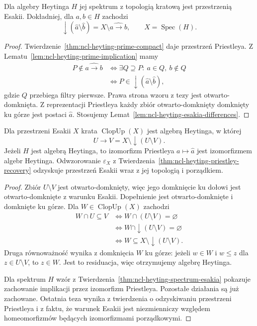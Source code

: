 \begin{twierdzenie}
\label{thm:ncl-heyting-spectrum-esakia}
Dla algebry Heytinga $H$ jej spektrum
z topologią kratową jest przestrzenią Esakii.
Dokładniej, dla $a,b\in H$ zachodzi
\[
 \downarrow(\widehat a\setminus\widehat b)
 =X\setminus\widehat{a\to b},
 \qquad X=\operatorname{Spec}(H).
\]
\end{twierdzenie}
\begin{proof}
Twierdzenie~\ref{thm:ncl-heyting-prime-compact}
daje przestrzeń Priestleya.
Z Lematu~\ref{lem:ncl-heyting-prime-implication}
mamy
\[
\begin{aligned}
 P\notin\widehat{a\to b}
 &\iff \exists Q\supseteq P:\ a\in Q,\ b\notin Q\\
 &\iff P\in\downarrow(\widehat a\setminus\widehat b),
\end{aligned}
\]
gdzie $Q$ przebiega filtry pierwsze.
Prawa strona wzoru z tezy jest otwarto-domknięta.
Z reprezentacji Priestleya każdy zbiór
otwarto-domknięty domknięty ku górze jest
postaci $\widehat a$. Stosujemy
Lemat~\ref{lem:ncl-heyting-esakia-differences}.
\end{proof}

\begin{twierdzenie}
\label{thm:ncl-heyting-esakia-algebra}
Dla przestrzeni Esakii $X$ krata
$\operatorname{ClopUp}(X)$ jest algebrą Heytinga,
w której
\[
 U\to V=X\setminus\downarrow(U\setminus V).
\]
Jeżeli $H$ jest algebrą Heytinga, to izomorfizm
Priestleya $a\mapsto\widehat a$ jest izomorfizmem
algebr Heytinga.
Odwzorowanie $\varepsilon_X$ z
Twierdzenia~\ref{thm:ncl-heyting-priestley-recovery}
odzyskuje przestrzeń Esakii wraz z jej topologią
i porządkiem.
\end{twierdzenie}
\begin{proof}
Zbiór $U\setminus V$ jest otwarto-domknięty,
więc jego domknięcie ku dołowi jest
otwarto-domknięte z warunku Esakii.
Dopełnienie jest otwarto-domknięte
i domknięte ku górze.
Dla $W\in\operatorname{ClopUp}(X)$ zachodzi
\[
\begin{aligned}
 W\cap U\subseteq V
 &\iff W\cap(U\setminus V)=\varnothing\\
 &\iff W\cap\downarrow(U\setminus V)=\varnothing\\
 &\iff W\subseteq X\setminus\downarrow(U\setminus V).
\end{aligned}
\]
Druga równoważność wynika z domknięcia $W$
ku górze: jeżeli $w\in W$ i $w\leq z$ dla
$z\in U\setminus V$, to $z\in W$.
Jest to residuacja, więc otrzymujemy algebrę Heytinga.

Dla spektrum $H$ wzór z
Twierdzenia~\ref{thm:ncl-heyting-spectrum-esakia}
pokazuje zachowanie implikacji przez izomorfizm
Priestleya. Pozostałe działania są już zachowane.
Ostatnia teza wynika z twierdzenia o odzyskiwaniu
przestrzeni Priestleya i z faktu, że warunek Esakii
jest niezmienniczy względem homeomorfizmów
będących izomorfizmami porządkowymi.
\end{proof}

